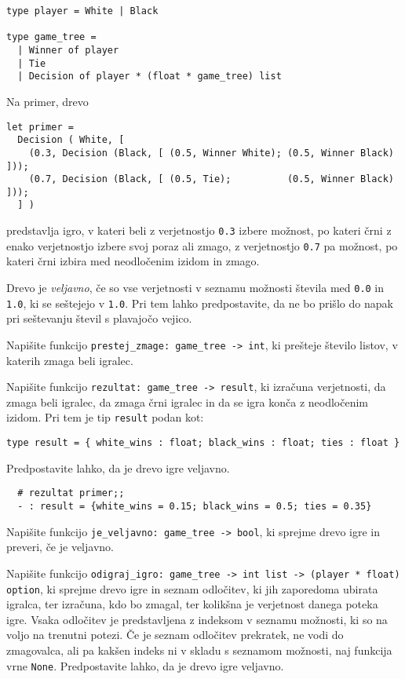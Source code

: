 \documentclass[arhiv]{../izpit}
\begin{document}
\begin{verbatim}
type player = White | Black

type game_tree =
  | Winner of player
  | Tie
  | Decision of player * (float * game_tree) list
\end{verbatim}
%
Na primer, drevo
%
\begin{verbatim}
let primer =
  Decision ( White, [
    (0.3, Decision (Black, [ (0.5, Winner White); (0.5, Winner Black) ]));
    (0.7, Decision (Black, [ (0.5, Tie);          (0.5, Winner Black) ]));
  ] )
\end{verbatim}
%
predstavlja igro, v kateri beli z verjetnostjo \verb|0.3| izbere možnost, po kateri črni z enako verjetnostjo izbere svoj poraz ali zmago, z verjetnostjo \verb|0.7| pa možnost, po kateri črni izbira med neodločenim izidom in zmago.

Drevo je \emph{veljavno}, če so vse verjetnosti v seznamu možnosti števila med \verb|0.0| in \verb|1.0|, ki se seštejejo v \verb|1.0|. Pri tem lahko predpostavite, da ne bo prišlo do napak pri seštevanju števil s plavajočo vejico.

\podnaloga
Napišite funkcijo \verb|prestej_zmage: game_tree -> int|, ki prešteje število listov, v katerih zmaga beli igralec.

\podnaloga
Napišite funkcijo \verb|rezultat: game_tree -> result|, ki izračuna verjetnosti, da zmaga beli igralec, da zmaga črni igralec in da se igra konča z neodločenim izidom. Pri tem je tip \verb|result| podan kot:
%
\begin{verbatim}
type result = { white_wins : float; black_wins : float; ties : float }
\end{verbatim}
%
Predpostavite lahko, da je drevo igre veljavno.

\begin{verbatim}
  # rezultat primer;;
  - : result = {white_wins = 0.15; black_wins = 0.5; ties = 0.35}
\end{verbatim}
  
\podnaloga
Napišite funkcijo \verb|je_veljavno: game_tree -> bool|, ki sprejme drevo igre in preveri, če je veljavno.

\podnaloga
Napišite funkcijo \verb|odigraj_igro: game_tree -> int list -> (player * float) option|, ki sprejme drevo igre in seznam odločitev, ki jih zaporedoma ubirata igralca, ter izračuna, kdo bo zmagal, ter kolikšna je verjetnost danega poteka igre. Vsaka odločitev je predstavljena z indeksom v seznamu možnosti, ki so na voljo na trenutni potezi. Če je seznam odločitev prekratek, ne vodi do zmagovalca, ali pa kakšen indeks ni v skladu s seznamom možnosti, naj funkcija vrne \verb|None|. Predpostavite lahko, da je drevo igre veljavno.
\end{document}
